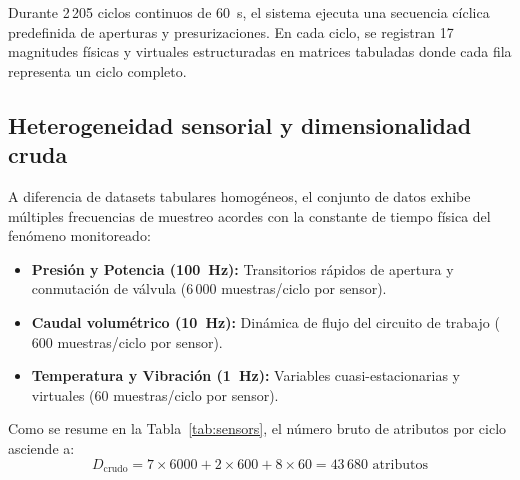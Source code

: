 \documentclass[journal]{IEEEtran}
\begin{document}
Durante 2\,205 ciclos continuos de \SI{60}{\second}, el sistema ejecuta una secuencia cíclica predefinida de aperturas y presurizaciones. En cada ciclo, se registran 17 magnitudes físicas y virtuales estructuradas en matrices tabuladas donde cada fila representa un ciclo completo.

\subsection{Heterogeneidad sensorial y dimensionalidad cruda}

A diferencia de datasets tabulares homogéneos, el conjunto de datos exhibe múltiples frecuencias de muestreo acordes con la constante de tiempo física del fenómeno monitoreado:
\begin{itemize}[leftmargin=*]
    \item \textbf{Presión y Potencia (\SI{100}{\hertz}):} Transitorios rápidos de apertura y conmutación de válvula ($6\,000$ muestras/ciclo por sensor).
    \item \textbf{Caudal volumétrico (\SI{10}{\hertz}):} Dinámica de flujo del circuito de trabajo ($600$ muestras/ciclo por sensor).
    \item \textbf{Temperatura y Vibración (\SI{1}{\hertz}):} Variables cuasi-estacionarias y virtuales ($60$ muestras/ciclo por sensor).
\end{itemize}

Como se resume en la Tabla~\ref{tab:sensors}, el número bruto de atributos por ciclo asciende a:
\begin{equation}
    D_{\text{crudo}} = 7 \times 6000 + 2 \times 600 + 8 \times 60 = 43\,680 \text{ atributos}
\end{equation}
\end{document}

